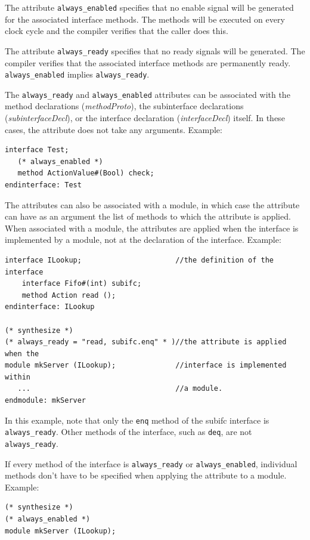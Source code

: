 \documentclass[twoside,letterpaper]{article}
\newcommand{\te}[1]{\texttt{#1}}
\begin{document}
The attribute \te{always\_enabled} specifies that
  no enable signal will be generated for the associated interface
methods. The methods will be executed on every clock cycle and the
compiler verifies that the caller does this. 

The attribute \te{always\_ready} specifies that no ready signals
will be  generated.  The
compiler verifies that the associated interface methods are permanently ready.
\te{always\_enabled} implies \te{always\_ready}.

The {\tt always\_ready} and {\tt always\_enabled} attributes can be
associated with the method declarations
({\em methodProto}), the subinterface declarations
({\em subinterfaceDecl}), or the interface declaration
({\em interfaceDecl}) itself.  In these cases, the attribute does not
take any arguments.  Example:
\begin{verbatim}
interface Test;
   (* always_enabled *)
   method ActionValue#(Bool) check;
endinterface: Test
\end{verbatim}

The attributes can also be associated with a module, in which case the
attribute can have as an argument the list of methods to which the
attribute is applied.  When associated with a module, the attributes
are applied when the interface is implemented by a module, not at the
declaration of the interface.  Example:
\begin{verbatim}
interface ILookup;                      //the definition of the interface
    interface Fifo#(int) subifc;   
    method Action read ();
endinterface: ILookup

(* synthesize *)
(* always_ready = "read, subifc.enq" * )//the attribute is applied when the
module mkServer (ILookup);              //interface is implemented within
   ...                                  //a module.  
endmodule: mkServer                    
\end{verbatim}

In this example, note that only the \te{enq} method of the
subifc interface is \te{always\_ready}.
Other methods of the interface, such as \te{deq}, are not \te{always\_ready}.

If every method of the interface is \te{always\_ready} or \te{always\_enabled},
individual methods don't have to be specified when applying the
attribute to a module.  Example:
\begin{verbatim}
(* synthesize *)
(* always_enabled *)
module mkServer (ILookup);
\end{verbatim}
\end{document}
